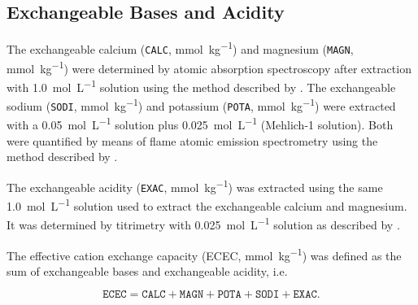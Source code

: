 \subsection{Exchangeable Bases and Acidity}
\label{chap:chap04-ecec}

The exchangeable calcium (\texttt{CALC}, \si{\milli\mole\per\kilo\gram}) and magnesium (\texttt{MAGN}, 
\si{\milli\mole\per\kilo\gram}) were determined by atomic absorption spectroscopy after extraction with 
\SI{1.0}{\mole\per\liter}  solution using the method described by . 
The exchangeable sodium (\texttt{SODI}, \si{\milli\mole\per\kilo\gram}) and potassium (\texttt{POTA}, 
\si{\milli\mole\per\kilo\gram}) were extracted with a \SI{0.05}{\mole\per\liter}  solution plus 
\SI{0.025}{\mole\per\liter}  (Mehlich-\num{1} solution). Both were quantified by means of flame 
atomic emission spectrometry using the method described by .

The exchangeable acidity (\texttt{EXAC}, \si{\milli\mole\per\kilo\gram}) was extracted using the same 
\SI{1.0}{\mole\per\liter}  solution used to extract the exchangeable calcium and magnesium. It was 
determined by titrimetry with \SI{0.025}{\mole\per\liter}  solution as described by 
.


The effective cation exchange capacity (ECEC, \si{\milli\mole\per\kilo\gram}) was defined as the sum of 
exchangeable bases and exchangeable acidity, i.e. 

\begin{equation*}
 \texttt{ECEC} = \texttt{CALC} + \texttt{MAGN} + \texttt{POTA} + \texttt{SODI} + \texttt{EXAC}.
\end{equation*}



